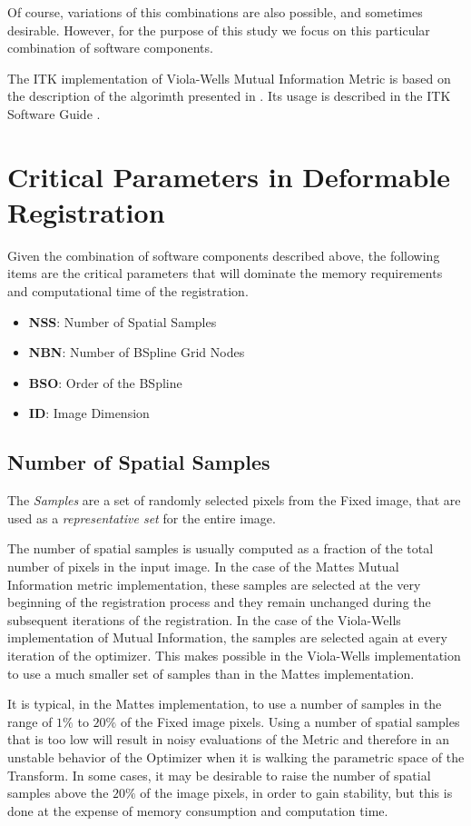 \documentclass{InsightArticle}
\begin{document}
Of course, variations of this combinations are also possible, and sometimes
desirable. However, for the purpose of this study we focus on this particular
combination of software components.

The ITK implementation of Viola-Wells Mutual Information Metric is based on the
description of the algorimth presented in \cite{}. Its
usage is described in the ITK Software Guide
\cite{ITKSoftwareGuideSecondEdition}.


\section{Critical Parameters in Deformable Registration}
\label{sec:CriticalParameters}

Given the combination of software components described above, the following
items are the critical parameters that will dominate the memory requirements
and computational time of the registration.

\begin{itemize}
\item \textbf{NSS}: Number of Spatial Samples
\item \textbf{NBN}: Number of BSpline Grid Nodes
\item \textbf{BSO}: Order of the BSpline
\item \textbf{ID}:  Image Dimension
\end{itemize}

\subsection{Number of Spatial Samples}

The \emph{Samples} are a set of randomly selected pixels from the Fixed image,
that are used as a \emph{representative set} for the entire image.

The number of spatial samples is usually computed as a fraction of the total
number of pixels in the input image.  In the case of the Mattes Mutual
Information metric implementation, these samples are selected at the very
beginning of the registration process and they remain unchanged during the
subsequent iterations of the registration. In the case of the Viola-Wells
implementation of Mutual Information, the samples are selected again at every
iteration of the optimizer. This makes possible in the Viola-Wells
implementation to use a much smaller set of samples than in the Mattes
implementation.

It is typical, in the Mattes implementation, to use a number of samples in the
range of $1\%$ to $20\%$ of the Fixed image pixels. Using a number of spatial
samples that is too low will result in noisy evaluations of the Metric and
therefore in an unstable behavior of the Optimizer when it is walking the
parametric space of the Transform. In some cases, it may be desirable to raise
the number of spatial samples above the $20\%$ of the image pixels, in order to
gain stability, but this is done at the expense of memory consumption and
computation time.
\end{document}
